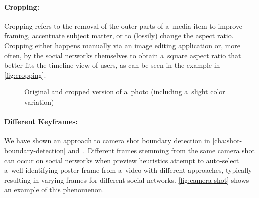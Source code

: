 \paragraph{Cropping:}

Cropping refers to the removal of the outer parts of a~media item
to improve framing, accentuate subject matter,
or to (lossily) change the aspect ratio.
Cropping either happens manually via an image editing application
or, more often, by the social networks themselves
to obtain a~square aspect ratio
that better fits the timeline view of users,
as can be seen in the example in \autoref{fig:cropping}.

\begin{figure}[!ht]
  \centering
  \caption[Original and cropped version of a~photo]
  {Original and cropped version of a~photo (including a~slight color variation)}
  \label{fig:cropping}  
\end{figure}

\paragraph{Different Keyframes:}

We have shown an approach to camera shot boundary detection
in \autoref{cha:shot-boundary-detection} and~\cite{steiner2012shotdetection}.
Different frames stemming from the same camera shot
can occur on social networks when preview heuristics
attempt to auto-select a~well-identifying poster frame from a~video with different approaches,
typically resulting in varying frames for different social networks.
\autoref{fig:camera-shot} shows an example of this phenomenon.

